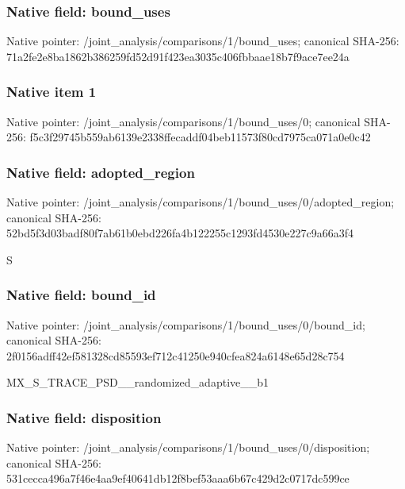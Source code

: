\documentclass[10pt,a4paper]{article}
\begin{document}
\subsubsection{Native field: bound\_\allowbreak{}uses}
Native pointer: /joint\_\allowbreak{}analysis/comparisons/1/bound\_\allowbreak{}uses; canonical SHA-256: 71a2fe2e8ba1862b386259fd52d91f423ea3035c406fbbaae18b7f9ace7ee24a

\subsubsection{Native item 1}
Native pointer: /joint\_\allowbreak{}analysis/comparisons/1/bound\_\allowbreak{}uses/0; canonical SHA-256: f5c3f29745b559ab6139e2338ffecaddf04beb11573f80cd7975ca071a0e0c42

\subsubsection{Native field: adopted\_\allowbreak{}region}
Native pointer: /joint\_\allowbreak{}analysis/comparisons/1/bound\_\allowbreak{}uses/0/adopted\_\allowbreak{}region; canonical SHA-256: 52bd5f3d03badf80f7ab61b0ebd226fa4b122255c1293fd4530e227c9a66a3f4

\begingroup\raggedright\sloppy S\par\endgroup

\subsubsection{Native field: bound\_\allowbreak{}id}
Native pointer: /joint\_\allowbreak{}analysis/comparisons/1/bound\_\allowbreak{}uses/0/bound\_\allowbreak{}id; canonical SHA-256: 2f0156adff42ef581328cd85593ef712c41250e940cfea824a6148e65d28c754

\begingroup\raggedright\sloppy MX\_\allowbreak{}S\_\allowbreak{}TRACE\_\allowbreak{}PSD\_\allowbreak{}\_\allowbreak{}randomized\_\allowbreak{}adaptive\_\allowbreak{}\_\allowbreak{}b1\par\endgroup

\subsubsection{Native field: disposition}
Native pointer: /joint\_\allowbreak{}analysis/comparisons/1/bound\_\allowbreak{}uses/0/disposition; canonical SHA-256: 531cecca496a7f46e4aa9ef40641db12f8bef53aaa6b67c429d2c0717dc599ce
\end{document}

